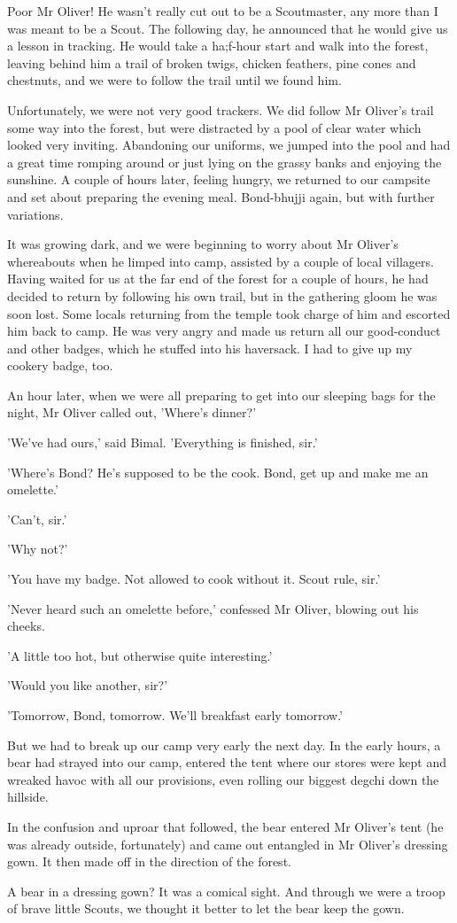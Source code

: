 Poor Mr Oliver! He wasn't really cut out to be a Scoutmaster, any more than I was meant to be a Scout. The following day, he announced that he would give us a lesson in tracking. He would take a ha;f-hour start and walk into the forest, leaving behind him a trail of broken twigs, chicken feathers, pine cones and chestnuts, and we were to follow the trail until we found him.
\par
Unfortunately, we were not very good trackers. We did follow Mr Oliver's trail some way into the forest, but were distracted by a pool of clear water which looked very inviting. Abandoning our uniforms, we jumped into the pool and had a great time romping around or just lying on the grassy banks and enjoying the sunshine. A couple of hours later, feeling hungry, we returned to our campsite and set about preparing the evening meal. Bond-bhujji again, but with further variations.
\par
It was growing dark, and we were beginning to worry about Mr Oliver's whereabouts when he limped into camp, assisted by a couple of local villagers. Having waited for us at the far end of the forest for a couple of hours, he had decided to return by following his own trail, but in the gathering gloom he was soon lost. Some locals returning from the temple took charge of him and escorted him back to camp. He was very angry and made us return all our good-conduct and other badges, which he stuffed into his haversack. I had to give up my cookery badge, too.
\par
An hour later, when we were all preparing to get into our sleeping bags for the night, Mr Oliver called out, 'Where's dinner?'
\par
'We've had ours,' said Bimal. 'Everything is finished, sir.'
\par
'Where's Bond? He's supposed to be the cook. Bond, get up and make me an omelette.'
\par
'Can't, sir.'
\par
'Why not?'
\par
'You have my badge. Not allowed to cook without it. Scout rule, sir.'
\par
'Never heard such an omelette before,' confessed Mr Oliver, blowing out his cheeks.
\par
'A little too hot, but otherwise quite interesting.'
\par
'Would you like another, sir?'
\par
'Tomorrow, Bond, tomorrow. We'll breakfast early tomorrow.'
\par
But we had to break up our camp very early the next day. In the early hours, a bear had strayed into our camp, entered the tent where our stores were kept and wreaked havoc with all our provisions, even rolling our biggest degchi down the hillside.
\par
In the confusion and uproar that followed, the bear entered Mr Oliver's tent (he was already outside, fortunately) and came out entangled in Mr Oliver's dressing gown. It then made off in the direction of the forest.
\par
A bear in a dressing gown? It was a comical sight. And through we were a troop of brave little Scouts, we thought it better to let the bear keep the gown.
